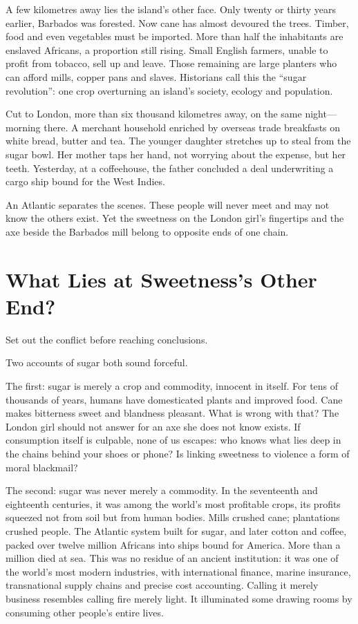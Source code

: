 A few kilometres away lies the island's other face. Only twenty or thirty years earlier, Barbados was forested. Now cane has almost devoured the trees. Timber, food and even vegetables must be imported. More than half the inhabitants are enslaved Africans, a proportion still rising. Small English farmers, unable to profit from tobacco, sell up and leave. Those remaining are large planters who can afford mills, copper pans and slaves. Historians call this the ``sugar revolution'': one crop overturning an island's society, ecology and population.

Cut to London, more than six thousand kilometres away, on the same night---morning there. A merchant household enriched by overseas trade breakfasts on white bread, butter and tea. The younger daughter stretches up to steal from the sugar bowl. Her mother taps her hand, not worrying about the expense, but her teeth. Yesterday, at a coffeehouse, the father concluded a deal underwriting a cargo ship bound for the West Indies.

An Atlantic separates the scenes. These people will never meet and may not know the others exist. Yet the sweetness on the London girl's fingertips and the axe beside the Barbados mill belong to opposite ends of one chain.

\section{What Lies at Sweetness's Other End?}
Set out the conflict before reaching conclusions.

Two accounts of sugar both sound forceful.

The first: sugar is merely a crop and commodity, innocent in itself. For tens of thousands of years, humans have domesticated plants and improved food. Cane makes bitterness sweet and blandness pleasant. What is wrong with that? The London girl should not answer for an axe she does not know exists. If consumption itself is culpable, none of us escapes: who knows what lies deep in the chains behind your shoes or phone? Is linking sweetness to violence a form of moral blackmail?

The second: sugar was never merely a commodity. In the seventeenth and eighteenth centuries, it was among the world's most profitable crops, its profits squeezed not from soil but from human bodies. Mills crushed cane; plantations crushed people. The Atlantic system built for sugar, and later cotton and coffee, packed over twelve million Africans into ships bound for America. More than a million died at sea. This was no residue of an ancient institution: it was one of the world's most modern industries, with international finance, marine insurance, transnational supply chains and precise cost accounting. Calling it merely business resembles calling fire merely light. It illuminated some drawing rooms by consuming other people's entire lives.

